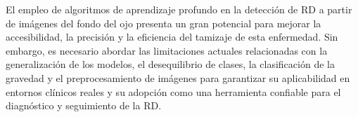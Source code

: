 El empleo de algoritmos de aprendizaje profundo en la detección de RD a partir de imágenes
del fondo del ojo presenta un gran potencial para mejorar la accesibilidad, la precisión y
la eficiencia del tamizaje de esta enfermedad. Sin embargo, es necesario abordar las
limitaciones actuales relacionadas con la generalización de los modelos, el desequilibrio
de clases, la clasificación de la gravedad y el preprocesamiento de imágenes para
garantizar su aplicabilidad en entornos clínicos reales y su adopción como una herramienta
confiable para el diagnóstico y seguimiento de la RD.















